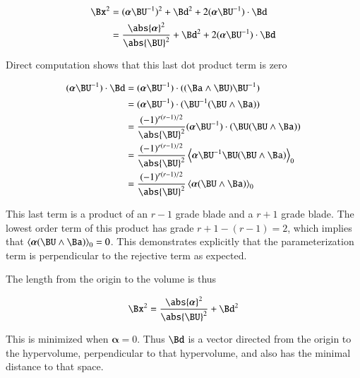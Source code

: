 \documentclass{article}
\newcommand{\Balpha}[0]{\boldsymbol{\alpha}}
\begin{document}
\begin{align*}
{\Bx}^2 
&= (\Balpha {\BU}^{-1})^2 + \Bd^2 + 2 (\Balpha \BU^{-1}) \cdot \Bd \\
&= \frac{\abs{\Balpha}^2}{{\abs{\BU}^2}} + \Bd^2 + 2 (\Balpha \BU^{-1}) \cdot \Bd
\end{align*}

Direct computation shows that this last dot product term is zero

\begin{align*}
(\Balpha \BU^{-1}) \cdot \Bd
&= (\Balpha \BU^{-1}) \cdot ((\Ba \wedge \BU){\BU}^{-1}) \\
&= (\Balpha \BU^{-1}) \cdot ( {\BU}^{-1} (\BU \wedge \Ba)) \\
&= \frac{(-1)^{r(r-1)/2}}{\abs{\BU}^2} (\Balpha \BU^{-1}) \cdot ( \BU (\BU \wedge \Ba)) \\
&= \frac{(-1)^{r(r-1)/2}}{\abs{\BU}^2} \left<\Balpha \BU^{-1} \BU (\BU \wedge \Ba)\right>_0 \\
&= \frac{(-1)^{r(r-1)/2}}{\abs{\BU}^2} \left<\Balpha (\BU \wedge \Ba)\right>_0 \\
\end{align*}

This last term is a product of an $r-1$ grade blade and a $r+1$ grade blade.  The lowest order term of this product has grade $r+1 -(r-1) = 2$, which
implies that
$\left<\Balpha (\BU \wedge \Ba)\right>_0 = 0$.  This demonstrates explicitly that the parameterization term is perpendicular to the rejective term as expected.

The length from the origin to the volume is thus

\begin{align*}
{\Bx}^2 &= \frac{\abs{\Balpha}^2}{{\abs{\BU}^2}} + \Bd^2 \\
\end{align*}

This is minimized when $\Balpha = 0$.  Thus $\Bd$ is a vector directed from the origin to the hypervolume, perpendicular to that hypervolume, and also has the minimal distance to that space.
\end{document}
